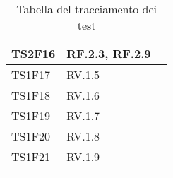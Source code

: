 \begin{center}
\begin{longtable}{|p{1.5cm}|p{11cm}|p{1cm}|}
            \rowcolor[HTML]{C0C0C0}
            TS2F16 & RF.2.3, RF.2.9\\ \hline
            \rowcolor[HTML]{EFEFEF}
            TS1F17 & RV.1.5\\ \hline
            \rowcolor[HTML]{C0C0C0}
            TS1F18 & RV.1.6\\ \hline
            \rowcolor[HTML]{EFEFEF}
            TS1F19 & RV.1.7\\ \hline
            \rowcolor[HTML]{C0C0C0}
            TS1F20 & RV.1.8\\ \hline
            \rowcolor[HTML]{EFEFEF}
            TS1F21 & RV.1.9\\ \hline
            \caption{Tabella del tracciamento dei test }
        \end{longtable}
    \end{center}


